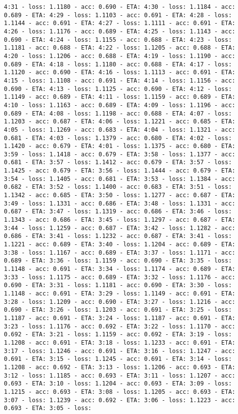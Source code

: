 \documentclass[11pt]{article}
\begin{document}
\begin{Verbatim}[commandchars=\\\{\}]
4:31 - loss: 1.1180 - acc: 0.690 - ETA: 4:30 - loss: 1.1184 - acc: 0.689 - ETA: 4:29 - loss: 1.1103 - acc: 0.691 - ETA: 4:28 - loss: 1.1144 - acc: 0.691 - ETA: 4:27 - loss: 1.1111 - acc: 0.691 - ETA: 4:26 - loss: 1.1176 - acc: 0.689 - ETA: 4:25 - loss: 1.1143 - acc: 0.690 - ETA: 4:24 - loss: 1.1155 - acc: 0.688 - ETA: 4:23 - loss: 1.1181 - acc: 0.688 - ETA: 4:22 - loss: 1.1205 - acc: 0.688 - ETA: 4:20 - loss: 1.1206 - acc: 0.688 - ETA: 4:19 - loss: 1.1190 - acc: 0.689 - ETA: 4:18 - loss: 1.1180 - acc: 0.688 - ETA: 4:17 - loss: 1.1120 - acc: 0.690 - ETA: 4:16 - loss: 1.1113 - acc: 0.691 - ETA: 4:15 - loss: 1.1108 - acc: 0.691 - ETA: 4:14 - loss: 1.1156 - acc: 0.690 - ETA: 4:13 - loss: 1.1125 - acc: 0.690 - ETA: 4:12 - loss: 1.1149 - acc: 0.689 - ETA: 4:11 - loss: 1.1159 - acc: 0.689 - ETA: 4:10 - loss: 1.1163 - acc: 0.689 - ETA: 4:09 - loss: 1.1196 - acc: 0.689 - ETA: 4:08 - loss: 1.1198 - acc: 0.688 - ETA: 4:07 - loss: 1.1203 - acc: 0.687 - ETA: 4:06 - loss: 1.1221 - acc: 0.685 - ETA: 4:05 - loss: 1.1269 - acc: 0.683 - ETA: 4:04 - loss: 1.1321 - acc: 0.681 - ETA: 4:03 - loss: 1.1379 - acc: 0.680 - ETA: 4:02 - loss: 1.1420 - acc: 0.679 - ETA: 4:01 - loss: 1.1375 - acc: 0.680 - ETA: 3:59 - loss: 1.1418 - acc: 0.679 - ETA: 3:58 - loss: 1.1377 - acc: 0.681 - ETA: 3:57 - loss: 1.1412 - acc: 0.679 - ETA: 3:57 - loss: 1.1425 - acc: 0.679 - ETA: 3:56 - loss: 1.1444 - acc: 0.679 - ETA: 3:54 - loss: 1.1405 - acc: 0.681 - ETA: 3:53 - loss: 1.1384 - acc: 0.682 - ETA: 3:52 - loss: 1.1400 - acc: 0.683 - ETA: 3:51 - loss: 1.1342 - acc: 0.685 - ETA: 3:50 - loss: 1.1277 - acc: 0.687 - ETA: 3:49 - loss: 1.1331 - acc: 0.686 - ETA: 3:48 - loss: 1.1331 - acc: 0.687 - ETA: 3:47 - loss: 1.1319 - acc: 0.686 - ETA: 3:46 - loss: 1.1343 - acc: 0.686 - ETA: 3:45 - loss: 1.1297 - acc: 0.687 - ETA: 3:44 - loss: 1.1259 - acc: 0.687 - ETA: 3:42 - loss: 1.1282 - acc: 0.686 - ETA: 3:41 - loss: 1.1232 - acc: 0.687 - ETA: 3:41 - loss: 1.1221 - acc: 0.689 - ETA: 3:40 - loss: 1.1204 - acc: 0.689 - ETA: 3:38 - loss: 1.1167 - acc: 0.689 - ETA: 3:37 - loss: 1.1171 - acc: 0.689 - ETA: 3:36 - loss: 1.1159 - acc: 0.690 - ETA: 3:35 - loss: 1.1148 - acc: 0.691 - ETA: 3:34 - loss: 1.1174 - acc: 0.689 - ETA: 3:33 - loss: 1.1175 - acc: 0.689 - ETA: 3:32 - loss: 1.1176 - acc: 0.690 - ETA: 3:31 - loss: 1.1181 - acc: 0.690 - ETA: 3:30 - loss: 1.1148 - acc: 0.691 - ETA: 3:29 - loss: 1.1149 - acc: 0.691 - ETA: 3:28 - loss: 1.1209 - acc: 0.690 - ETA: 3:27 - loss: 1.1216 - acc: 0.690 - ETA: 3:26 - loss: 1.1203 - acc: 0.691 - ETA: 3:25 - loss: 1.1187 - acc: 0.691 - ETA: 3:24 - loss: 1.1187 - acc: 0.691 - ETA: 3:23 - loss: 1.1176 - acc: 0.692 - ETA: 3:22 - loss: 1.1170 - acc: 0.692 - ETA: 3:21 - loss: 1.1159 - acc: 0.692 - ETA: 3:19 - loss: 1.1208 - acc: 0.691 - ETA: 3:18 - loss: 1.1233 - acc: 0.691 - ETA: 3:17 - loss: 1.1246 - acc: 0.691 - ETA: 3:16 - loss: 1.1247 - acc: 0.691 - ETA: 3:15 - loss: 1.1245 - acc: 0.691 - ETA: 3:14 - loss: 1.1208 - acc: 0.692 - ETA: 3:13 - loss: 1.1206 - acc: 0.693 - ETA: 3:12 - loss: 1.1185 - acc: 0.693 - ETA: 3:11 - loss: 1.1207 - acc: 0.693 - ETA: 3:10 - loss: 1.1204 - acc: 0.693 - ETA: 3:09 - loss: 1.1215 - acc: 0.693 - ETA: 3:08 - loss: 1.1205 - acc: 0.693 - ETA: 3:07 - loss: 1.1239 - acc: 0.692 - ETA: 3:06 - loss: 1.1223 - acc: 0.693 - ETA: 3:05 - loss: 
\end{Verbatim}
\end{document}
